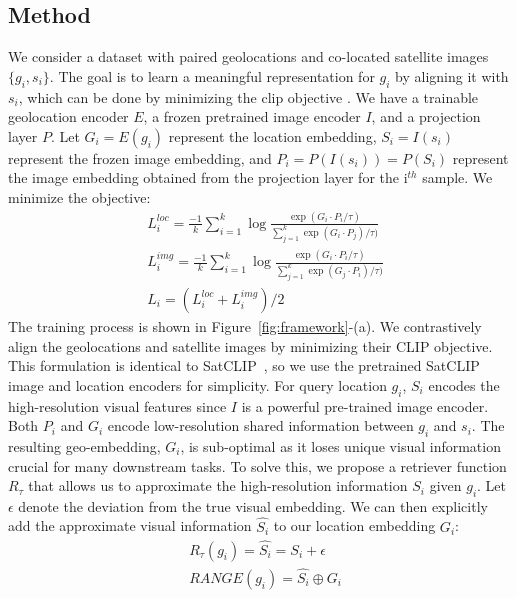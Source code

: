 \subsection{Method}
\label{sec:range-method}
We consider a dataset with paired geolocations and co-located satellite images $\{g_i, s_i\}$. The goal is to learn a meaningful representation for $g_i$ by aligning it with $s_i$, which can be done by minimizing the clip objective \cite{klemmer2023satclip, vivanco2024geoclip, radford2021learning}. We have a trainable geolocation encoder $E$, a frozen pretrained image encoder $I$, and a projection layer $P$. Let $G_i = E(g_i)$ represent the location embedding, $S_i = {I(s_i)}$ represent the frozen image embedding, and $P_i = P(I(s_i))=P(S_i)$ represent the image embedding obtained from the projection layer for the i$^{th}$ sample. We minimize the objective:
%
\begin{align}
&L_{i}^{loc} = \frac{-1}{k}\sum_{i=1}^{k} \log\frac{\exp(G_i \cdot P_i / \tau)}{\sum_{j=1}^{k} \exp(G_i \cdot P_j) / \tau) } \\
&L_{i}^{img} = \frac{-1}{k}\sum_{i=1}^{k} \log\frac{\exp(G_i \cdot P_i / \tau)}{\sum_{j=1}^{k} \exp(G_j \cdot P_i) / \tau) } \\
&L_i = (L_i^{loc} + L_i^{img})/2 
\end{align}
%
The training process is shown in Figure~\ref{fig:framework}-(a). We contrastively align the geolocations and satellite images by minimizing their CLIP objective. This formulation is identical to SatCLIP~\cite{klemmer2023satclip}, so we use the pretrained SatCLIP image and location encoders for simplicity. For query location $g_i$, $S_i$ encodes the high-resolution visual features since $I$ is a powerful pre-trained image encoder. Both $P_i$ and $G_i$ encode low-resolution shared information between $g_i$ and $s_i$. The resulting geo-embedding, $G_i$, is sub-optimal as it loses unique visual information crucial for many downstream tasks. To solve this, we propose a retriever function $R_\tau$ that allows us to approximate the high-resolution information $S_i$ given $g_i$. Let $\epsilon$ denote the deviation from the true visual embedding. We can then explicitly add the approximate visual information $\hat{S_i}$ to our location embedding $G_i$:
    \begin{align}
    &R_\tau(g_i) = \hat{S_i} = S_i + \epsilon \\
    &RANGE(g_i) = \hat{S_i} \oplus G_i 
    \end{align}

